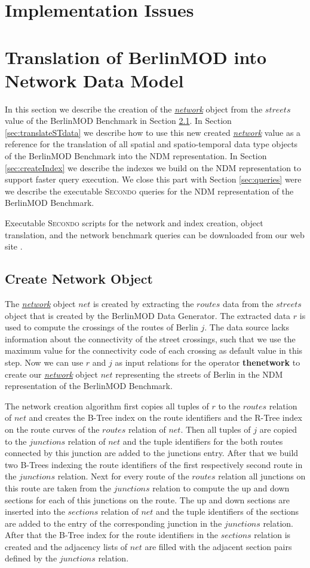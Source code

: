 \documentclass[a4paper]{article}
\newcommand{\secondo}{\textsc{Secondo}}
\newcommand{\bmodb} {BerlinMOD Benchmark}
\newcommand{\op}[1]{\textbf{#1}}
\newcommand{\dt}[1]{\textsl{\underline{#1}}}
\begin{document}
{\section{Implementation Issues}
\label{sec:implNDM}
\section{Translation of BerlinMOD into Network Data Model}
\label{sec:Translation}
In this section we describe the creation of the \dt{network} object from the $streets$
value of the \bmodb{} in Section \ref{sec:createNetwork}. In Section
\ref{sec:translateSTdata} we describe how to use this new created \dt{network}
value as a reference for the translation of all spatial and spatio-temporal data
type objects of the \bmodb{} into the NDM representation.
In Section \ref{sec:createIndex} we describe the indexes we build on the NDM
representation to support faster query execution. We close this part
with Section \ref{sec:queries} were we describe the executable \secondo{} queries
for the NDM representation of the \bmodb{}.

Executable \secondo{} scripts for the network and index creation, object translation,
and the network benchmark queries can be downloaded from our web site \cite{NetworkWeb}.
\subsection{Create Network Object}
\label{sec:createNetwork}
The \dt{network} object $net$ is created by extracting the $routes$ data from
the $streets$ object that is created by the BerlinMOD Data Generator.
The extracted data $r$ is used to compute the crossings of the
routes of Berlin $j$. The data source lacks information about the connectivity
of the street crossings, such that we use the maximum value for the connectivity
code of each crossing as default value in this step.
Now we can use $r$ and $j$ as input relations for the operator \op{thenetwork}
to create our \dt{network} object $net$ representing the streets of Berlin in
the NDM representation of the \bmodb{}.

The network creation algorithm first copies all tuples of $r$ to the
$routes$ relation of $net$ and creates the B-Tree index on the route
identifiers and the R-Tree index on the route curves of the $routes$ relation of
$net$. Then all tuples of $j$ are copied to the $junctions$ relation
of $net$ and the tuple identifiers for the both routes connected
by this junction are added to the junctions entry. After that we build two B-Trees
indexing the route identifiers of the first respectively second route in the
$junctions$ relation. Next for every route of the $routes$ relation all junctions
on this route are taken from the $junctions$ relation to compute the up and
down sections for each of this junctions on the route. The up and down
sections are inserted into the $sections$ relation of $net$ and the
tuple identifiers of the sections are added to the entry of the corresponding
junction in the $junctions$ relation. After that the B-Tree index for the
route identifiers in the $sections$ relation is created and the adjacency
lists of $net$ are filled with the adjacent section pairs defined by the
$junctions$ relation.

}
\end{document}
